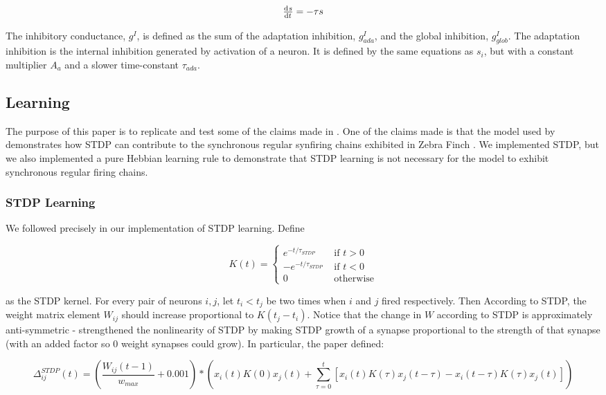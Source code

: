\[\od{s}{t} = -\tau s\]

The inhibitory conductance, \(g^I\), is defined as the sum of the adaptation inhibition, \(g^I_{ada}\), and the global inhibition, \(g^I_{glob}\). The adaptation inhibition is the internal inhibition generated by activation of a neuron. It is defined by the same equations as \(s_i\), but with a constant multiplier \(A_a\) and a slower time-constant \(\tau_{ada}\).

\subsection{Learning}

The purpose of this paper is to replicate and test some of the claims made in \cite{Fiete}. One of the claims made is that the model used by \cite{Fiete} demonstrates how STDP can contribute to the synchronous regular synfiring chains exhibited in Zebra Finch \cite{Hahnloser2002}. We implemented STDP, but we also implemented a pure Hebbian learning rule to demonstrate that STDP learning is not necessary for the model to exhibit synchronous regular firing chains.

\subsubsection{STDP Learning}

We followed \cite{Fiete} precisely in our implementation of STDP learning. Define

\[K(t) = 
\begin{cases}
e^{-t/\tau_{STDP}} &\text{ if } t > 0\\
-e^{-t/\tau_{STDP}} &\text{ if } t < 0\\
0 &\text{ otherwise}
\end{cases}
\]

\noindent as the STDP kernel. For every pair of neurons \(i,j\), let \(t_i < t_j\) be two times when \(i\) and \(j\) fired respectively. Then According to STDP, the weight matrix element \(W_{ij}\) should increase proportional to \(K(t_j - t_i)\). Notice that the change in \(W\) according to STDP is approximately anti-symmetric \cite{Fiete} - strengthened the nonlinearity of STDP by making STDP growth of a synapse proportional to the strength of that synapse (with an added factor so 0 weight synapses could grow). In particular, the paper defined:

\begin{equation}
\Delta^{STDP}_{ij}(t) = \left(\frac{W_{ij}(t-1)}{w_{max}} + 0.001\right)*\left(x_i(t)K(0)x_j(t) + \sum_{\tau = 0}^t  [x_i(t)K(\tau)x_j(t -\tau) - x_i(t - \tau)K(\tau)x_j(t)]\right)
\label{STDP}
\end{equation}

